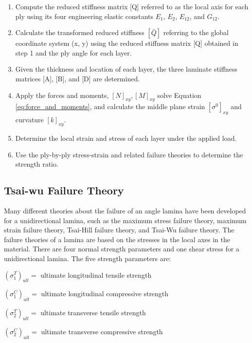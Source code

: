 \documentclass[10pt, journal]{IEEEtran}
\begin{document}
\begin{enumerate}
\item Compute the reduced stiffness matrix [Q] referred to as the local axis for each ply using its four engineering elastic constants $E_1 $, $E_2 $, $E_{12} $, and $G_{12} $.

\item Calculate the transformed reduced stiffness $[\bar{Q}] $ referring to the global coordinate system (x, y) using the reduced stiffness matrix [Q] obtained in step 1 and the ply angle for each layer.

\item  Given the thickness and location of each layer, the three laminate stiffness matrices [A], [B], and [D] are determined.

\item  Apply the forces and moments, $[N]_{xy}, [M]_{xy} $ solve
Equation \ref{eq:force_and_moments}, and calculate the middle plane strain $[\sigma ^{0}]_{xy} $ and curvature $[k]_{xy} $.

\item Determine the local strain and stress of each layer under the applied load.

\item  Use the ply-by-ply stress-strain and related failure theories to determine the strength ratio.
\end{enumerate}

\subsection{Tsai-wu Failure Theory}

Many different theories about the failure of an angle lamina have been developed for a
unidirectional lamina, such as the maximum stress failure theory, maximum strain failure theory,
Tsai-Hill failure theory, and Tsai-Wu failure theory. The failure theories of a lamina are based on
the stresses in the local axes in the material. There are four normal strength parameters and one shear
stress for a unidirectional lamina. The five strength parameters are:

$(\sigma _1^{T})_{ult}= $ ultimate longitudinal tensile strength

$(\sigma _1^{C})_{ult}= $ ultimate longitudinal compressive strength

$(\sigma _2^{T})_{ult}= $ ultimate transverse tensile strength

$(\sigma _2^{C})_{ult}= $ ultimate transverse compressive strength 
\end{document}
